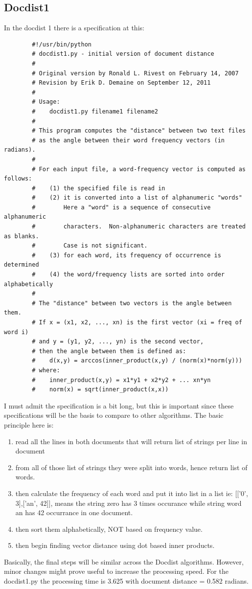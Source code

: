 \documentclass{article}
\begin{document}
    \subsection{Docdist1}
    In the docdist 1 there is a specification at this:
    \begin{lstlisting}
        #!/usr/bin/python
        # docdist1.py - initial version of document distance
        #
        # Original version by Ronald L. Rivest on February 14, 2007
        # Revision by Erik D. Demaine on September 12, 2011
        #
        # Usage:
        #    docdist1.py filename1 filename2
        #     
        # This program computes the "distance" between two text files
        # as the angle between their word frequency vectors (in radians).
        #
        # For each input file, a word-frequency vector is computed as follows:
        #    (1) the specified file is read in
        #    (2) it is converted into a list of alphanumeric "words"
        #        Here a "word" is a sequence of consecutive alphanumeric
        #        characters.  Non-alphanumeric characters are treated as blanks.
        #        Case is not significant.
        #    (3) for each word, its frequency of occurrence is determined
        #    (4) the word/frequency lists are sorted into order alphabetically
        #
        # The "distance" between two vectors is the angle between them.
        # If x = (x1, x2, ..., xn) is the first vector (xi = freq of word i)
        # and y = (y1, y2, ..., yn) is the second vector,
        # then the angle between them is defined as:
        #    d(x,y) = arccos(inner_product(x,y) / (norm(x)*norm(y)))
        # where:
        #    inner_product(x,y) = x1*y1 + x2*y2 + ... xn*yn
        #    norm(x) = sqrt(inner_product(x,x))

    \end{lstlisting}
    I must admit the specification is a bit long, but this is important since these specifications will be the basis to compare to other algorithms.
    The basic principle here is:
    \begin{enumerate}
        \item read all the lines in both documents that will return list of strings per line in document
        \item from all of those list of strings they were split into words, hence return list of words.
        \item then calculate the frequency of each word and put it into list in a list ie: [['0', 3],['an', 42]], means the string zero has 3 times occurance while string word an has 42 occurrance in one document.
        \item then sort them alphabetically, NOT based on frequency value.
        \item then begin finding vector distance using dot based inner products.
    \end{enumerate}
    Basically, the final steps will be similar across the Docdist algorithms. 
    However, minor changes might prove useful to increase the processing speed. 
    For the docdist1.py the processing time is 3.625 with document distance = 0.582 radians.
\end{document}
